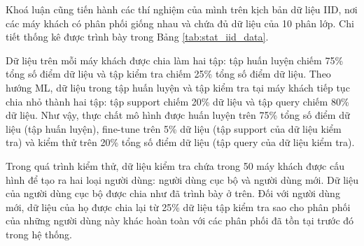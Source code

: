 Khoá luận cũng tiến hành các thí nghiệm của mình trên kịch bản dữ liệu IID, nơi các máy khách có phân phối giống nhau và chứa đủ dữ liệu của 10 phân lớp. Chi tiết thống kê được trình bày trong Bảng \ref{tab:stat_iid_data}.

\begin{table}[H]
    \caption{Thống kê trên hai tập dữ liệu MNIST và CIFAR-10 (dữ liệu IID)}
    \label{tab:stat_iid_data}
\end{table}

Dữ liệu trên mỗi máy khách được chia làm hai tập: tập huấn luyện chiếm 75\% tổng số điểm dữ liệu và tập kiểm tra chiếm 25\% tổng số điểm dữ liệu. Theo hướng ML, dữ liệu trong tập huấn luyện và tập kiểm tra tại máy khách tiếp tục chia nhỏ thành hai tập: tập support chiếm 20\% dữ liệu và tập query chiếm 80\% dữ liệu. Như vậy, thực chất mô hình được huấn luyện trên 75\% tổng số điểm dữ liệu (tập huấn luyện), fine-tune trên 5\% dữ liệu (tập support của dữ liệu kiểm tra) và kiểm thử trên 20\% tổng số điểm dữ liệu (tập query của dữ liệu kiểm tra).

Trong quá trình kiểm thử, dữ liệu kiểm tra chứa trong 50 máy khách được cấu hình để tạo ra hai loại người dùng: người dùng cục bộ và người dùng mới. Dữ liệu của người dùng cục bộ được chia như đã trình bày ở trên. Đối với người dùng mới, dữ liệu của họ được chia lại từ 25\% dữ liệu tập kiểm tra sao cho phân phối của những người dùng này khác hoàn toàn với các phân phối đã tồn tại trước đó trong hệ thống.

